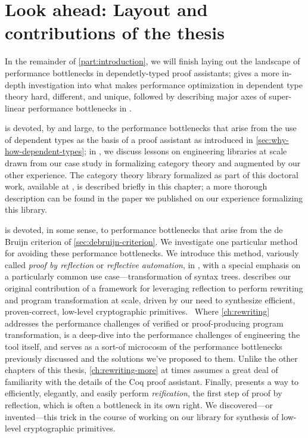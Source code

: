 
\section{Look ahead: Layout and contributions of the thesis}\label{sec:intro:layout}
In the remainder of \autoref{part:introduction}, we will finish laying out the landscape of performance bottlenecks in dependetly-typed proof assistants;
 gives a more in-depth investigation into what makes performance optimization in dependent type theory hard, different, and unique, followed by describing major axes of super-linear performance bottlenecks in .

 is devoted, by and large, to the performance bottlenecks that arise from the use of dependent types as the basis of a proof assistant as introduced in \autoref{sec:why-how-dependent-types};
in , we discuss lessons on engineering libraries at scale drawn from our case study in formalizing category theory %
and augmented by our other experience.
The category theory library formalized as part of this doctoral work, available at \textcite{HoTT/HoTT-categories}, is described briefly in this chapter; a more thorough description can be found in the paper we published on our experience formalizing this library.~\cite{category-coq-experience}

 is devoted, in some sense, to performance bottlenecks that arise from the de Bruijn criterion of \autoref{sec:debruijn-criterion}.
We investigate one particular method for avoiding these performance bottlenecks.
We introduce this method, variously called \emph{proof by reflection} or \emph{reflective automation}, in , with a special emphasis on a particularly common use case---transformation of syntax trees.
 describes our original contribution of a framework for leveraging reflection to perform rewriting and program transformation at scale, driven by our need to synthesize efficient, proven-correct, low-level cryptographic primitives.~\cite{FiatCryptoSP19}
Where \autoref{ch:rewriting} addresses the performance challenges of verified or proof-producing program transformation,  is a deep-dive into the performance challenges of engineering the tool itself, and serves as a sort-of microcosm of the performance bottlenecks previously discussed and the solutions we've proposed to them.
Unlike the other chapters of this thesis, \autoref{ch:rewriting-more} at times assumes a great deal of familiarity with the details of the Coq proof assistant.
Finally,  presents a way to efficiently, elegantly, and easily perform \emph{reification}, the first step of proof by reflection, which is often a bottleneck in its own right.
We discovered---or invented---this trick in the course of working on our library for synthesis of low-level cryptographic primitives.~\cite{FiatCryptoSP19,reification-by-parametricity}

